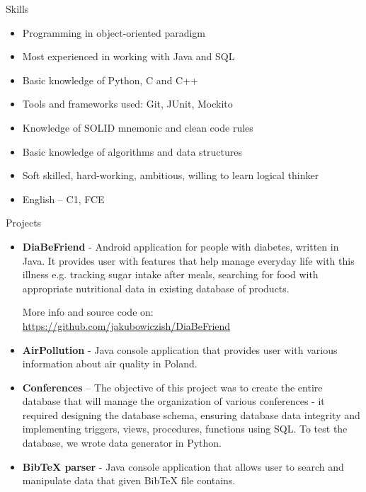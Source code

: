\documentclass{resume} %
\begin{document}
\begin{rSection}{Skills}
\begin{itemize}
 \setlength\itemsep{-0.5em}
\item Programming in object-oriented paradigm
\item Most experienced in working with Java and SQL
\item Basic knowledge of Python, C and C++
\item Tools and frameworks used: Git, JUnit, Mockito
\item Knowledge of SOLID mnemonic and clean code rules
\item Basic knowledge of algorithms and data structures
\item Soft skilled, hard-working, ambitious, willing to learn logical thinker
\item English – C1, FCE
\end{itemize}
\end{rSection}



\begin{rSection}{Projects}
\begin{itemize} 
 \setlength\itemsep{0em}
\item \textbf{DiaBeFriend} - Android application for people with diabetes, written in Java. 
It provides user with features that
help manage everyday life with this illness e.g. tracking sugar intake after meals, searching for food with appropriate nutritional data in existing database of products.

 More info and source code on: \url{https://github.com/jakubowiczish/DiaBeFriend}

\item \textbf{AirPollution} - Java console application that provides user with various information about air quality in Poland.

\item \textbf{Conferences} – The objective of this project was to create the entire database that will manage the organization
of various conferences - it required designing the database schema, ensuring database data integrity and
implementing triggers, views, procedures, functions using SQL. To test the database, we wrote data generator in
Python.

\item \textbf{BibTeX parser} - Java console application that allows user to search and manipulate data that given BibTeX file
contains.
\end{itemize}
\end{rSection}
\end{document}
